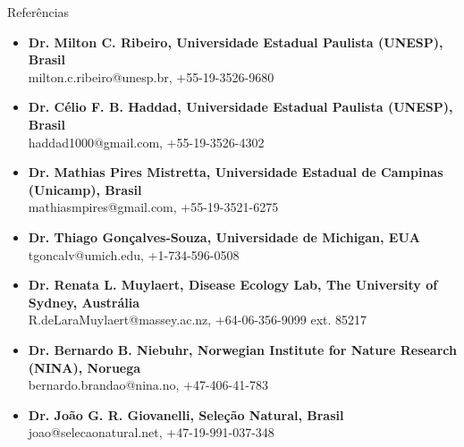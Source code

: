 \documentclass{resume}
\begin{document}
\begin{rSection}{Referências}
\begin{itemize}
\item {\bf Dr. Milton C. Ribeiro, Universidade Estadual Paulista (UNESP), Brasil}\\
milton.c.ribeiro@unesp.br, +55-19-3526-9680
\item {\bf Dr. Célio F. B. Haddad, Universidade Estadual Paulista (UNESP), Brasil}\\
haddad1000@gmail.com, +55-19-3526-4302
\item {\bf Dr. Mathias Pires Mistretta, Universidade Estadual de Campinas (Unicamp), Brasil}\\
mathiasmpires@gmail.com, +55-19-3521-6275
\item {\bf Dr. Thiago Gonçalves-Souza, Universidade de Michigan, EUA}\\
tgoncalv@umich.edu, +1-734-596-0508
\item {\bf Dr. Renata L. Muylaert, Disease Ecology Lab, The University of Sydney, Austrália}\\
R.deLaraMuylaert@massey.ac.nz, +64-06-356-9099 ext. 85217
\item {\bf Dr. Bernardo B. Niebuhr, Norwegian Institute for Nature Research (NINA), Noruega}\\
bernardo.brandao@nina.no, +47-406-41-783
\item {\bf Dr. João G. R. Giovanelli, Seleção Natural, Brasil}\\
joao@selecaonatural.net, +47-19-991-037-348
\end{itemize}
\end{rSection}
\end{document}
